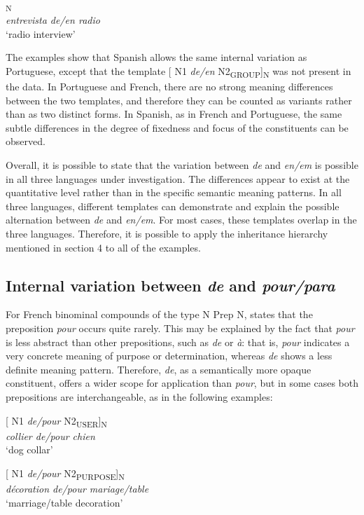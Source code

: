 \documentclass[output=paper]{langsci/langscibook}
\begin{document}
\ea{}\textsubscript{N}\\
\textit{entrevista de/en radio}\\
`radio interview'
\z

The examples show that Spanish allows the same internal variation as Portuguese, except that the template [ N1 \textit{de/en} N2\textsubscript{GROUP}]\textsubscript{N} was not present in the data. In Portuguese and French, there are no strong meaning differences between the two templates, and therefore they can be counted as variants rather than as two distinct forms. In Spanish, as in French and Portuguese, the same subtle differences in the degree of fixedness and focus of the constituents can be observed. 

Overall, it is possible to state that the variation between \textit{de} and \textit{en/em} is possible in all three languages under investigation. The differences appear to exist at the quantitative level rather than in the specific semantic meaning patterns. In all three languages, different templates can demonstrate and explain the possible alternation between \textit{de} and \textit{en/em}. For most cases, these templates overlap in the three languages. Therefore, it is possible to apply the inheritance hierarchy mentioned in section 4 to all of the examples.

 \subsection{Internal variation between \textit{de} and \textit{pour/para}}
 
 For French binominal compounds of the type N Prep N, \citet{Laumann:1998} states that the preposition \textit{pour} occurs quite rarely. This may be explained by the fact that \textit{pour} is less abstract than other prepositions, such as \textit{de} or \textit{à}: that is, \textit{pour }indicates a very concrete meaning of purpose or determination, whereas \textit{de} shows a less definite meaning pattern. Therefore, \textit{de}, as a semantically more opaque constituent, offers a wider scope for application than \textit{pour}, but in some cases both prepositions are interchangeable, as in the following examples:\\ 

\begin{exe}\ex\begin{minipage}[t]{0.4\textwidth}    %
[ N1 \textit{de/pour} N2\textsubscript{USER}]\textsubscript{N}\\
\textit{collier de/pour chien}\\
`dog collar'
\end{minipage}\hfill%
\begin{minipage}[t]{0.45\textwidth}
[ N1 \textit{de/pour} N2\textsubscript{PURPOSE}]\textsubscript{N}\\
\textit{décoration de/pour mariage/table}\\
`marriage/table decoration'
\end{minipage}
\end{exe}
\end{document}
